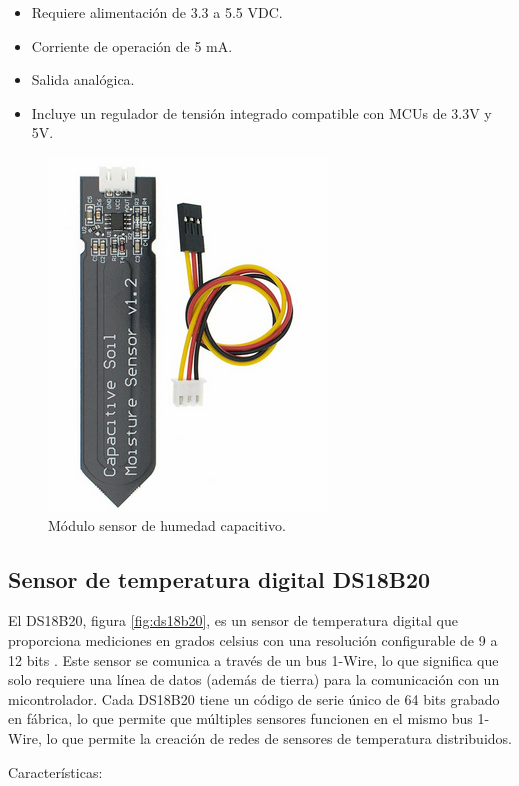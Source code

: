 \begin{itemize}
	\item Requiere alimentación de 3.3 a 5.5 VDC.
	\item Corriente de operación de 5 mA.
	\item Salida analógica.
	\item Incluye un regulador de tensión integrado compatible con MCUs de 3.3V y 5V.
\end{itemize}


\begin{figure}[h]
\centering
\includegraphics[scale=.5]{./Figures/moisture.png}
	\caption{Módulo sensor de humedad capacitivo.}
	\label{fig:moisture}
\end{figure}

\subsection{Sensor de temperatura digital DS18B20}

El DS18B20, figura \ref{fig:ds18b20}, es un sensor de temperatura digital que proporciona mediciones en grados celsius con una resolución configurable de 9 a 12 bits \cite{DS18B20}. Este sensor se comunica a través de un bus 1-Wire, lo que significa que solo requiere una línea de datos (además de tierra) para la comunicación con un micontrolador. Cada DS18B20 tiene un código de serie único de 64 bits grabado en fábrica, lo que permite que múltiples sensores funcionen en el mismo bus 1-Wire, lo que permite la creación de redes de sensores de temperatura distribuidos.

Características:

